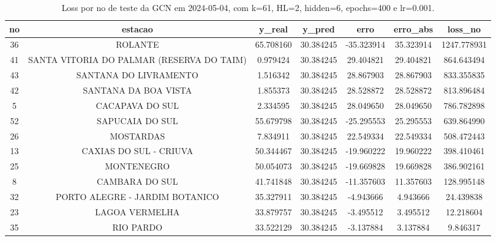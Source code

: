 \begin{table}[h]
\centering
\caption{Loss por no de teste da GCN em 2024-05-04, com k=61, HL=2, hidden=6, epochs=400 e lr=0.001.}
\label{tab:gcn_loss_k61_hl2_h6_e400_d20240504}
\begin{tabular}{ccccccc}
\toprule
no & estacao & y\_real & y\_pred & erro & erro\_abs & loss\_no \\
\midrule
36 & ROLANTE & 65.708160 & 30.384245 & -35.323914 & 35.323914 & 1247.778931 \\
41 & SANTA VITORIA DO PALMAR (RESERVA DO TAIM) & 0.979424 & 30.384245 & 29.404821 & 29.404821 & 864.643494 \\
43 & SANTANA DO LIVRAMENTO & 1.516342 & 30.384245 & 28.867903 & 28.867903 & 833.355835 \\
42 & SANTANA DA BOA VISTA & 1.855373 & 30.384245 & 28.528872 & 28.528872 & 813.896484 \\
5 & CACAPAVA DO SUL & 2.334595 & 30.384245 & 28.049650 & 28.049650 & 786.782898 \\
52 & SAPUCAIA DO SUL & 55.679798 & 30.384245 & -25.295553 & 25.295553 & 639.864990 \\
26 & MOSTARDAS & 7.834911 & 30.384245 & 22.549334 & 22.549334 & 508.472443 \\
13 & CAXIAS DO SUL - CRIUVA & 50.344467 & 30.384245 & -19.960222 & 19.960222 & 398.410461 \\
25 & MONTENEGRO & 50.054073 & 30.384245 & -19.669828 & 19.669828 & 386.902161 \\
8 & CAMBARA DO SUL & 41.741848 & 30.384245 & -11.357603 & 11.357603 & 128.995148 \\
32 & PORTO ALEGRE - JARDIM BOTANICO & 35.327911 & 30.384245 & -4.943666 & 4.943666 & 24.439838 \\
23 & LAGOA VERMELHA & 33.879757 & 30.384245 & -3.495512 & 3.495512 & 12.218604 \\
35 & RIO PARDO & 33.522129 & 30.384245 & -3.137884 & 3.137884 & 9.846317 \\
\bottomrule
\end{tabular}
\end{table}
